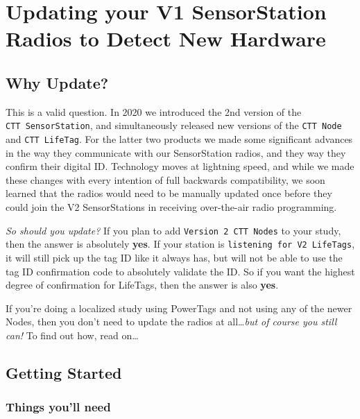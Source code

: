 \documentclass[
]{article}
\author{}
\date{\vspace{-2.5em}7/1/2020}
\begin{document}
{
\setcounter{tocdepth}{2}
\tableofcontents
}
\hypertarget{updating-your-v1-sensorstation-radios-to-detect-new-hardware}{%
\section{Updating your V1 SensorStation Radios to Detect New
Hardware}\label{updating-your-v1-sensorstation-radios-to-detect-new-hardware}}

\hypertarget{why-update}{%
\subsection{Why Update?}\label{why-update}}

This is a valid question. In 2020 we introduced the 2nd version of the
\texttt{CTT\ SensorStation}, and simultaneously released new versions of
the \texttt{CTT\ Node} and \texttt{CTT\ LifeTag}. For the latter two
products we made some significant advances in the way they communicate
with our SensorStation radios, and they way they confirm their digital
ID. Technology moves at lightning speed, and while we made these changes
with every intention of full backwards compatibility, we soon learned
that the radios would need to be manually updated once before they could
join the V2 SensorStations in receiving over-the-air radio programming.

\emph{So should you update?} If you plan to add
\texttt{Version\ 2\ CTT\ Nodes} to your study, then the answer is
absolutely \textbf{yes}. If your station is
\texttt{listening\ for\ V2\ LifeTags}, it will still pick up the tag ID
like it always has, but will not be able to use the tag ID confirmation
code to absolutely validate the ID. So if you want the highest degree of
confirmation for LifeTags, then the answer is also \textbf{yes}.

If you're doing a localized study using PowerTags and not using any of
the newer Nodes, then you don't need to update the radios at
all\ldots{}\emph{but of course you still can!} To find out how, read
on\ldots{}

\hypertarget{getting-started}{%
\subsection{Getting Started}\label{getting-started}}

\hypertarget{things-youll-need}{%
\subsubsection{Things you'll need}\label{things-youll-need}}
\end{document}

